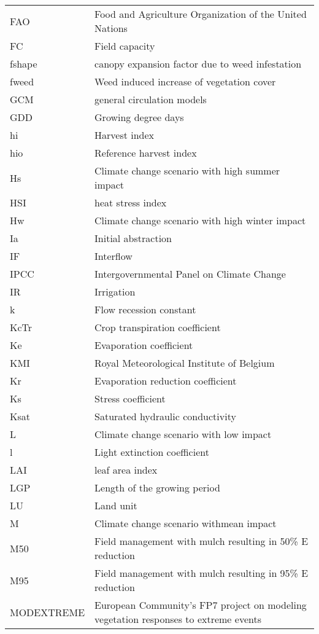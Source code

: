 \begin{tabularx}{\textwidth}{lX}
FAO   & Food and Agriculture Organization of the United Nations \\
FC    & Field capacity \\
fshape & canopy expansion factor due to weed infestation \\
fweed & Weed induced increase of vegetation cover  \\
GCM   & general circulation models \\
GDD   & Growing degree days \\
hi    & Harvest index  \\
hio   & Reference harvest index \\
Hs    & Climate change scenario with high summer impact \\
HSI   & heat stress index \\
Hw    & Climate change scenario with high winter impact \\
Ia    & Initial abstraction  \\
IF    & Interflow \\
IPCC  & Intergovernmental Panel on Climate Change \\
IR    & Irrigation  \\
k     & Flow recession constant  \\
KcTr  & Crop transpiration coefficient \\
Ke    & Evaporation coefficient \\
KMI   & Royal Meteorological Institute of Belgium \\
Kr    & Evaporation reduction coefficient \\
Ks    & Stress coefficient \\
Ksat  & Saturated hydraulic conductivity  \\
L     & Climate change scenario with low impact \\
l     & Light extinction coefficient \\
LAI   & leaf area index \\
LGP   & Length of the growing period \\
LU    & Land unit \\
M     & Climate change scenario withmean impact \\
M50   & Field management with mulch resulting in 50\% E reduction \\
M95   & Field management with mulch resulting in 95\% E reduction \\
MODEXTREME & European Community’s FP7 project on modeling vegetation responses to extreme events  \\

\end{tabularx}
